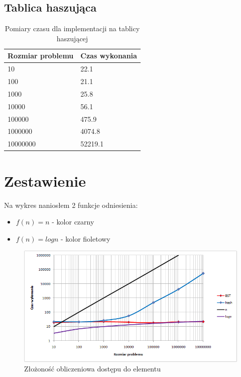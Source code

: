 \documentclass[10pt,oneside]{mwbk}
\begin{document}
	\subsection {Tablica haszująca}
	
	\begin{table}[h]
	\centering
    \begin{tabular}{|l|l|}
    \hline
     Rozmiar problemu & Czas wykonania \\ \hline
    10                & 22.1           \\ \hline
    100               & 21.1           \\ \hline
    1000              & 25.8           \\ \hline
    10000             & 56.1           \\ \hline
    100000            & 475.9          \\ \hline
    1000000           & 4074.8         \\ \hline
    10000000          & 52219.1        \\ \hline
    \end{tabular}
    \caption {Pomiary czasu dla implementacji na tablicy haszującej}
\end{table}
	
	\newpage
	\section { Zestawienie}
	Na wykres naniosłem 2 funkcje odniesienia:
	\begin {itemize}
		\item        $f(n)=n$ - kolor czarny
		\item  $f(n)=logn$ - kolor fioletowy\\
	\end {itemize} 
	
	\begin{figure}[!h]
	\centering
	\includegraphics[scale=0.8]{wykres.png}
	\caption{ Złożoność obliczeniowa dostępu do elementu}
	\end{figure}
	
\end{document}
